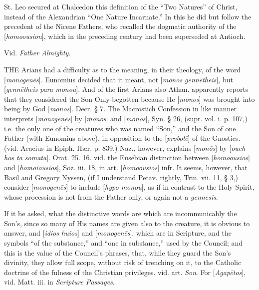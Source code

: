 St. Leo secured at Chalcedon this definition of
the ``Two Natures'' of Christ, instead of the Alexandrian ``One Nature
Incarnate.'' In this he did but follow the precedent of the Nicene
Fathers, who recalled the dogmatic authority of the [\emph{homoousion}],
which in the preceding century had been superseded at Antioch.

\xsection{[Monarchia]}

Vid. \emph{Father Almighty}.

\xsection{[Monogenes]}

THE
Arians had a difficulty as to the meaning, in their theology, of the
word [\emph{monogen\={e}s}]. Eunomius decided that it meant, not [\emph{monos
genn\={e}theis}], but [\emph{genn\={e}theis para monou}]. And
of the first Arians also Athan. apparently reports that they
considered the Son Only-begotten because He [\emph{monos}] was brought
into being by God [\emph{monos}]. Decr. § 7. The Macrostich
Confession in like manner interprets [\emph{monogen\={e}s}] by [\emph{monos}]
and [\emph{mon\={o}s}], Syn. § 26, (supr. vol. i. p. 107,) i.e.
the only one of the creatures who was named ``Son,'' and the Son of one
Father (with Eunomius above), in opposition to the [\emph{probol\={e}}]
of the Gnostics. (vid. Acacius in Epiph. Hær. p. 839.) Naz., however,
explains [\emph{mon\={o}s}] by [\emph{ouch h\={o}s ta s\={o}mata}].
Orat. 25. 16. vid. the Eusebian distinction between [\emph{homoousios}]
and [\emph{homoiousios}], Soz. iii. 18, in art. [\emph{homoousios}]
infr. It seems, however, that Basil and Gregory Nyssen, (if I
understand Petav. rightly, Trin. vii. 11, § 3,) consider [\emph{monogen\={e}s}]
to include [\emph{hypo monou}], as if in contrast to the Holy Spirit,
whose procession is not from the Father only, or again not a \emph{gennesis}.

If it be asked, what the distinctive words are
which are incommunicably the Son's, since so many of His names are
given also to the creature, it is obvious to answer, and [\emph{idios
huios}] and [\emph{monogen\={e}s}], which are in Scripture, and
the symbols ``of the substance,'' and ``one in substance,'' used by
the Council; and this is the value of the Council's phrases, that,
while they guard the Son's divinity, they allow full scope, without
risk of trenching on it, to the Catholic doctrine of the fulness of
the Christian privileges. vid. art. \emph{Son}. For [\emph{Agap\={e}tos}],
vid. Matt. iii. in \emph{Scripture Passages}.


